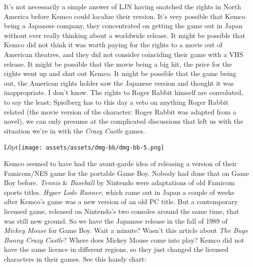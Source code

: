 \documentclass{book}
\begin{document}
It’s not necessarily a simple answer of LJN having snatched the rights in North America before Kemco could localize their version. It’s very possible that Kemco being a Japanese company, they concentrated on getting the game out in Japan without ever really thinking about a worldwide release. It might be possible that Kemco did not think it was worth paying for the rights to a movie out of American theatres, and they did not consider coinciding their game with a VHS release. It might be possible that the movie being a big hit, the price for the rights went up and shut out Kemco. It might be possible that the game being out, the American rights holder saw the Japanese version and thought it was inappropriate. I don’t know. The rights to Roger Rabbit himself are convoluted, to say the least; Spielberg has to this day a veto on anything Roger Rabbit related (the movie version of the character: Roger Rabbit was adapted from a novel), we can only presume at the complicated discussions that left us with the situation we’re in with the \emph{Crazy Castle} games.\par
\begin{wrapfigure}{L}{0pt}{\texttt{[image: assets/assets/dmg-bb/dmg-bb-5.png]}}\end{wrapfigure}\noindent
Kemco seemed to have had the avant-garde idea of releasing a version of their Famicom/NES game for the portable Game Boy. Nobody had done that on Game Boy before. \emph{Tennis} \& \emph{Baseball} by Nintendo were adaptations of old Famicom sports titles. \emph{Hyper Lode Runner}, which came out in Japan a couple of weeks after Kemco’s game was a new version of an old PC title. But a contemporary licensed game, released on Nintendo’s two consoles around the same time, that was still new ground. So we have the Japanese release in the fall of 1989 of \emph{Mickey Mouse} for Game Boy. Wait a minute? Wasn’t this article about \emph{The Bugs Bunny Crazy Castle}? Where does Mickey Mouse come into play? Kemco did not have the same licence in different regions, so they just changed the licensed characters in their games. See this handy chart:\par
\end{document}
